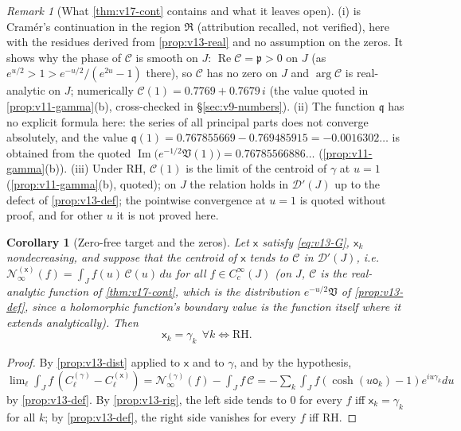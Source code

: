 \documentclass[11pt,a4paper]{article}
\numberwithin{equation}{section}
\newtheorem{corollary}[theorem]{Corollary}
\theoremstyle{definition}
\theoremstyle{remark}
\newtheorem{remark}[theorem]{Remark}
\begin{document}
\begin{remark}[What \cref{thm:v17-cont} contains and what it leaves open]\label{rem:v17-scope}
(i)  is Cram\'er's continuation \cite{Cramer1919} in the region $\mathfrak R$ (attribution recalled, not verified), here with the residues derived from \cref{prop:v13-real} and no assumption on the zeros. It shows why the phase of $\mathscr C$ is smooth on $J$: $\operatorname{Re}\mathscr C=\mathfrak p>0$ on $J$ (as $e^{u/2}>1>e^{-u/2}/(e^{2u}-1)$ there), so $\mathscr C$ has no zero on $J$ and $\arg\mathscr C$ is real-analytic on $J$; numerically $\mathscr C(1)=0.7769+0.7679\,i$ (the value quoted in \cref{prop:v11-gamma}(b), cross-checked in \S\ref{sec:v9-numbers}). (ii) The function $\mathfrak q$ has no explicit formula here: the series of all principal parts does not converge absolutely, and the value $\mathfrak q(1)=0.767855669-0.769485915=-0.0016302\ldots$ is obtained from the quoted $\operatorname{Im}\bigl(e^{-1/2}\mathfrak V(1)\bigr)=0.76785566886\ldots$ (\cref{prop:v11-gamma}(b)). (iii) Under RH, $\mathscr C(1)$ is the limit of the centroid of $\gamma$ at $u=1$ (\cref{prop:v11-gamma}(b), quoted); on $J$ the relation holds in $\mathcal D'(J)$ up to the defect of \cref{prop:v13-def}; the pointwise convergence at $u=1$ is quoted without proof, and for other $u$ it is not proved here.
\end{remark}

\begin{corollary}[Zero-free target and the zeros]\label{cor:v17-rig}
Let $\mathsf x$ satisfy \eqref{eq:v13-G}, $\mathsf x_k$ nondecreasing, and suppose that the centroid of $\mathsf x$ tends to $\mathscr C$ in $\mathcal D'(J)$, i.e.\ $\mathscr N_\infty^{(\mathsf x)}(f)=\int_Jf(u)\,\mathscr C(u)\,du$ for all $f\in C_c^\infty(J)$ (on $J$, $\mathscr C$ is the real-analytic function of \cref{thm:v17-cont}, which is the distribution $e^{-u/2}\mathfrak V$ of \cref{prop:v13-def}, since a holomorphic function's boundary value is the function itself where it extends analytically). Then
\begin{equation}
\mathsf x_k=\gamma_k\ \ \forall k\iff\text{RH}.
\end{equation}
\end{corollary}
\begin{proof}
By \cref{prop:v13-dist} applied to $\mathsf x$ and to $\gamma$, and by the hypothesis, $\lim_\ell\int_Jf\,(C_\ell^{(\gamma)}-C_\ell^{(\mathsf x)})=\mathscr N_\infty^{(\gamma)}(f)-\int_Jf\,\mathscr C=-\sum_k\int_Jf(\cosh(u\mathsf o_k)-1)e^{iu\gamma_k}du$ by \cref{prop:v13-def}. By \cref{prop:v13-rig}, the left side tends to $0$ for every $f$ iff $\mathsf x_k=\gamma_k$ for all $k$; by \cref{prop:v13-def}, the right side vanishes for every $f$ iff RH.
\end{proof}
\end{document}
